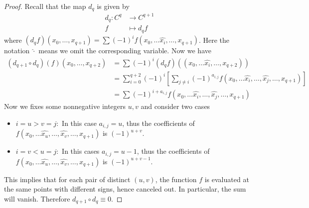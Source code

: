 \documentclass[12pt]{article} %
\begin{document}
\begin{proof}
  Recall that the map $d_q$ is given by
  \begin{align*}
    d_q \colon C^q & \to C^{q+1}   \\
    f              & \mapsto d_q f
  \end{align*}
  where $(d_q f)(x_0,\ldots,x_{q+1}) = \sum (-1)^i f(x_0,\ldots \hat{x_i},\ldots,x_{q+1})$. Here the notation
  $\hat{\cdot}$ means we omit the corresponding variable. Now we have
  \begin{align*}(d_{q+1} \circ d_q)(f)(x_0,\ldots,x_{q+2}) & = \sum (-1)^i(d_q f)((x_0,\ldots \hat{x_i},\ldots,x_{q+2}))                                                                 \\
                                                         & = \sum_{i=0}^{q+2} (-1)^i \left[\sum_{j\ne i} (-1)^{a_{i,j}} f(x_0,\ldots \hat{x_i},\ldots,\hat{x_j},\ldots,x_{q+1})\right] \\
                                                         & =\sum (-1)^{i+a_{i,j}}f(x_0,\ldots \hat{x_i},\ldots,\hat{x_j},\ldots,x_{q+1})
  \end{align*}
  Now we fixes some nonnegative integers $u,v$ and consider two cases
  \begin{itemize}
    \item $i =u> v = j: $ In this case $a_{i,j} = u$, thus the coefficients of $f(x_0,\ldots \hat{x_u},\ldots,\hat{x_v},\ldots,x_{q+1})$ is $(-1)^{u+v}$.
    \item $i = v< u  =j: $ In this cases $a_{i,j} = u-1$,  thus the coefficients of $f(x_0,\ldots \hat{x_u},\ldots,\hat{x_v},\ldots,x_{q+1})$ is $(-1)^{u+v-1}$.
  \end{itemize}
  This implies that for each pair of distinct $(u,v)$, the function $f$ is evaluated at the same points with different signs, hence canceled out.
  In particular, the sum will vanish. Therefore $d_{q+1} \circ d_q \equiv 0$.
\end{proof}
\end{document}
